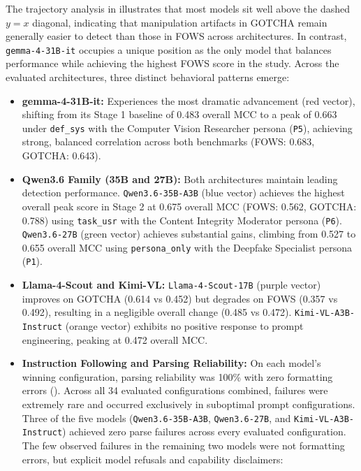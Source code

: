 The trajectory analysis in  illustrates that most models sit well above the dashed $y = x$ diagonal, indicating that manipulation artifacts in GOTCHA remain generally easier to detect than those in FOWS across architectures. In contrast, \texttt{gemma-4-31B-it} occupies a unique position as the only model that balances performance while achieving the highest FOWS score in the study. Across the evaluated architectures, three distinct behavioral patterns emerge:
\begin{itemize}
    \item \textbf{gemma-4-31B-it:} Experiences the most dramatic advancement (red vector), shifting from its Stage 1 baseline of \num{0.483} overall MCC to a peak of \num{0.663} under \texttt{def\_sys} with the Computer Vision Researcher persona (\texttt{P5}), achieving strong, balanced correlation across both benchmarks (FOWS: \num{0.683}, GOTCHA: \num{0.643}).
    \item \textbf{Qwen3.6 Family (35B and 27B):} Both architectures maintain leading detection performance. \texttt{Qwen3.6-35B-A3B} (blue vector) achieves the highest overall peak score in Stage 2 at \num{0.675} overall MCC (FOWS: \num{0.562}, GOTCHA: \num{0.788}) using \texttt{task\_usr} with the Content Integrity Moderator persona (\texttt{P6}). \texttt{Qwen3.6-27B} (green vector) achieves substantial gains, climbing from \num{0.527} to \num{0.655} overall MCC using \texttt{persona\_only} with the Deepfake Specialist persona (\texttt{P1}).
    \item \textbf{Llama-4-Scout and Kimi-VL:} \texttt{Llama-4-Scout-17B} (purple vector) improves on GOTCHA (\num{0.614} vs \num{0.452}) but degrades on FOWS (\num{0.357} vs \num{0.492}), resulting in a negligible overall change (\num{0.485} vs \num{0.472}). \texttt{Kimi-VL-A3B-Instruct} (orange vector) exhibits no positive response to prompt engineering, peaking at \num{0.472} overall MCC.
    \item \textbf{Instruction Following and Parsing Reliability:} On each model's winning configuration, parsing reliability was \num{100}\% with zero formatting errors (). Across all 34 evaluated configurations combined, failures were extremely rare and occurred exclusively in suboptimal prompt configurations. Three of the five models (\texttt{Qwen3.6-35B-A3B}, \texttt{Qwen3.6-27B}, and \texttt{Kimi-VL-A3B-Instruct}) achieved zero parse failures across every evaluated configuration. The few observed failures in the remaining two models were not formatting errors, but explicit model refusals and capability disclaimers:

\end{itemize}
